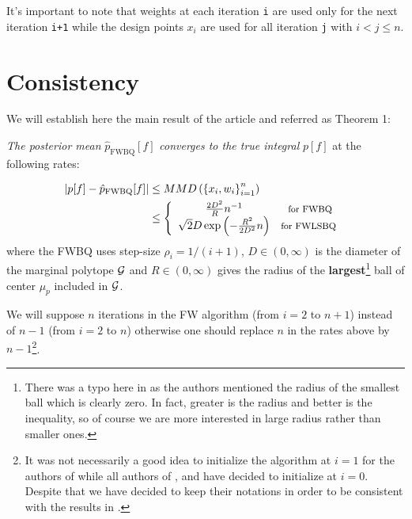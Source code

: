  It's important to note that weights at each iteration \texttt{i} are used only for
 the next iteration \texttt{i+1} while the design points $x_i$ are used for all iteration \texttt{j} with $i<j\leq n$.

\section{Consistency}
\label{sec:consistency}

We will establish here the main result of the article \cite{FWBQ} and referred as Theorem 1:
\begin{boxdefinition}
  \begin{center}
    \textit{The posterior mean }$\hat { p } _ { \mathrm { FWBQ } } [ f ]$ \textit{converges
    to the true integral }$p[f]$ at the following rates:
  \end{center}
\begin{align}
    \left| p [ f ] - \hat { p } _ { \mathrm { FWBQ } } [ f ] \right| &\leq M M D \left( \left\{ x _ { i } , w _ { i } \right\} _ { i = 1 } ^ { n } \right) \nonumber\\
    &\leq \left\{ \begin{array} { c c } { \frac { 2 D ^ { 2 } } { R } n ^ { - 1 } } & { \footnotesize \text {for  FWBQ} } \\ { \sqrt { 2 } D \exp \left( - \frac { R ^ { 2 } } { 2 D ^ { 2 } } n \right) } & {\footnotesize \text {for FWLSBQ } } \end{array} \right.
\end{align}
where the FWBQ uses step-size $\rho _ { i } = 1 / ( i + 1 )$, $D \in ( 0 , \infty )$
  is the diameter of the marginal polytope $\mathcal{G}$ and $R \in ( 0 , \infty )$ gives the
  radius of the \textbf{largest}\footnote{There was a typo here in \cite{FWBQ} as the authors mentioned the radius  of the smallest ball which is clearly zero. In fact, greater is the radius and better is the inequality, so of course we are more interested in large
  radius rather than smaller ones. } ball of center $\mu_p$ included in $\mathcal{G}$.

  We will suppose $n$ iterations in the FW algorithm (from $i=2$ to $n+1$) instead of $n-1$ (from $i=2$
  to $n$) otherwise one should replace $n$ in the rates above by $n-1$\footnote{It was not necessarily a good idea to initialize the algorithm at $i=1$ for the authors of
  \cite{FWBQ} while all authors of \cite{Bach}, \cite{Beck} and \cite{Chen} have
  decided to initialize at $i=0$. Despite that we have decided to keep their notations
  in order to be consistent with the results in \cite{FWBQ}.
  }.
\end{boxdefinition}

